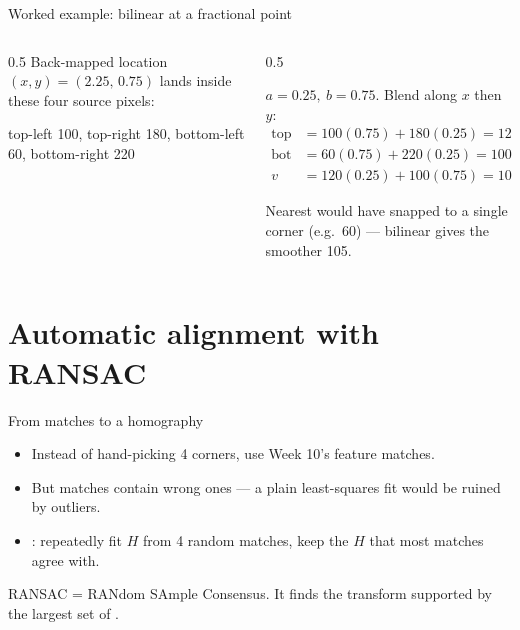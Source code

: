 \documentclass[10pt,aspectratio=169]{beamer}
\begin{document}
\begin{frame}{Worked example: bilinear at a fractional point}
  \begin{columns}[T]
    \begin{column}{0.5\textwidth}
      Back-mapped location $(x,y)=(2.25,\,0.75)$ lands inside these four source pixels:
      \begin{center}\end{center}
      {\scriptsize top-left 100, top-right 180, bottom-left 60, bottom-right 220}
    \end{column}
    \begin{column}{0.5\textwidth}
      \begin{mathbox}
        $a=0.25,\ b=0.75$. Blend along $x$ then $y$:
        \begin{align*}
          \text{top} &= 100(0.75)+180(0.25)=120\\
          \text{bot} &= 60(0.75)+220(0.25)=100\\
          v &= 120(0.25)+100(0.75)=105
        \end{align*}
      \end{mathbox}
      Nearest would have snapped to a single corner (e.g.\ 60) — bilinear gives the smoother 105.
    \end{column}
  \end{columns}
\end{frame}

\section{Automatic alignment with RANSAC}

\begin{frame}{From matches to a homography}
  \begin{itemize}
    \item Instead of hand-picking 4 corners, use Week 10's feature matches.
    \item But matches contain wrong ones — a plain least-squares fit would be ruined by outliers.
    \item {}: repeatedly fit $H$ from 4 random matches, keep the $H$ that most matches agree with.
  \end{itemize}
  \begin{mathbox}
    RANSAC = RANdom SAmple Consensus. It finds the transform supported by the largest set of .
  \end{mathbox}
\end{frame}
\end{document}
